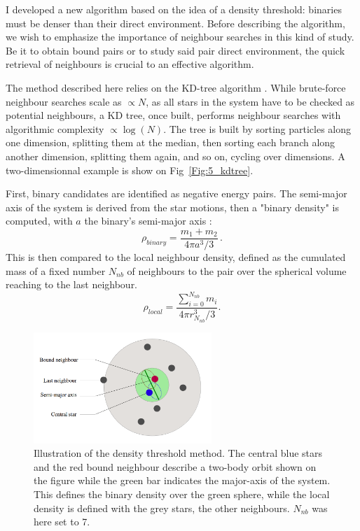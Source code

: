 I developed a new algorithm based on the idea of a density threshold: binaries must be denser than their direct environment. Before describing the algorithm, we wish to emphasize the importance of neighbour searches in this kind of study. Be it to obtain bound pairs or to study said pair direct environment, the quick retrieval of neighbours is crucial to an effective algorithm.

The method described here relies on the KD-tree algorithm \citep{numericalrecipes}. While brute-force neighbour searches scale as $\propto N$, as all stars in the system have to be checked as potential neighbours, a KD tree, once built, performs neighbour searches with algorithmic complexity $\propto\log (N)$. The tree is built by sorting particles along one dimension, splitting them at the median, then sorting each branch along another dimension, splitting them again, and so on, cycling over dimensions. A two-dimensionnal example is show on Fig~\ref{Fig:5_kdtree}.





First, binary candidates are identified as negative energy pairs. The semi-major axis of the system is derived from the star motions, then a "binary density" is computed, with $a$ the binary's semi-major axis :
\begin{equation}
 \rho_{binary} = \frac{m_1 + m_2 }{4\pi a^3/3 }\, .
\end{equation}
This is then compared to the local neighbour density, defined as the cumulated mass of a fixed number $N_{nb}$ of neighbours to the pair over the spherical volume reaching to the last neighbour.
\begin{equation}
 \rho_{local} =  \frac{\sum\limits_{i=0}^{N_{nb}} m_i}{ 4 \pi r_{N_{nb}}^3 /3} .
\end{equation}


\begin{figure}
\begin{center}
\includegraphics[width=0.6\textwidth]{Figures/5_neighbours}
\caption[Illustration of the density threshold method]{Illustration of the density threshold method. The central blue stars and the red bound neighbour describe a two-body orbit shown on the figure while the green bar indicates the major-axis of the system. This defines the binary density over the green sphere, while the local density is defined with the grey stars, the other neighbours. $N_{nb}$ was here set to 7. }
\label{Fig:5_neighbours}
\end{center}
\end{figure}




